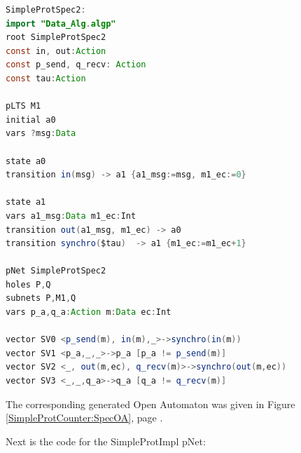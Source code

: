 \documentclass{lmcs}
\begin{document}
\begin{lstlisting}[basicstyle=\scriptsize\ttfamily, language=java, frame=single]
SimpleProtSpec2:
import "Data_Alg.algp"
root SimpleProtSpec2
const in, out:Action
const p_send, q_recv: Action
const tau:Action

pLTS M1
initial a0 
vars ?msg:Data

state a0
transition in(msg) -> a1 {a1_msg:=msg, m1_ec:=0}

state a1
vars a1_msg:Data m1_ec:Int
transition out(a1_msg, m1_ec) -> a0
transition synchro($tau)  -> a1 {m1_ec:=m1_ec+1}

pNet SimpleProtSpec2
holes P,Q
subnets P,M1,Q
vars p_a,q_a:Action m:Data ec:Int

vector SV0 <p_send(m), in(m),_>->synchro(in(m))
vector SV1 <p_a,_,_>->p_a [p_a != p_send(m)]
vector SV2 <_, out(m,ec), q_recv(m)>->synchro(out(m,ec))
vector SV3 <_,_,q_a>->q_a [q_a != q_recv(m)]

  \end{lstlisting}

The corresponding generated Open Automaton was given in Figure \ref{SimpleProtCounter:SpecOA},
page \pageref{SimpleProtCounter:SpecOA}.

Next is the code for the SimpleProtImpl pNet:
\end{document}

